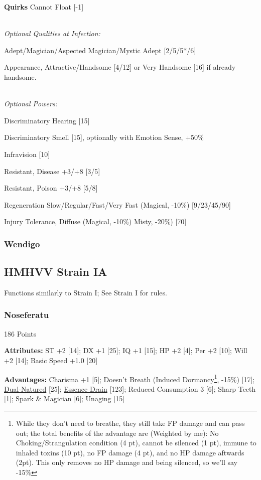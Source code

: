 \begin{multicols*}{3}
	\textbf{Quirks} 
	Cannot Float [-1]
	
	\textit{\\Optional Qualities at Infection:}
	
	Adept/Magician/Aspected Magician/Mystic Adept [2/5/5*/6]
	
	Appearance, Attractive/Handsome [4/12] or Very Handsome [16] if already handsome.	
	
	\textit{\\Optional Powers:}
		
	Discriminatory Hearing [15]
	
	Discriminatory Smell [15], optionally with Emotion Sense, +50\%
	
	Infravision [10]
	
	Resistant, Disease +3/+8 [3/5]
	
	Resistant, Poison +3/+8 [5/8]
	
	Regeneration Slow/Regular/Fast/Very Fast (Magical, -10\%) [9/23/45/90]
	
	Injury Tolerance, Diffuse (Magical, -10\%) Misty, -20\%) [70]
	
	\subsubsection{Wendigo}\label{wendigo}
	
	\subsection*{HMHVV Strain IA}
	
	Functions similarly to Strain I; See Strain I for rules.
	
	\subsubsection{Noseferatu}\label{nosferatu}
	\begin{flushright}
		186 Points
	\end{flushright}
	
	\textbf{Attributes:}
	ST +2 [14]; DX +1 [25]; IQ +1 [15]; HP +2 [4]; Per +2 [10]; Will +2 [14]; Basic Speed +1.0 [20]
	
	\textbf{Advantages:}
	Charisma +1 [5]; Doesn't Breath (Induced Dormancy\footnote{While they don't need to breathe, they still take FP damage and can pass out; the total benefits of the advantage are (Weighted by me): No Choking/Strangulation condition (4 pt), cannot be silenced (1 pt), immune to inhaled toxins (10 pt), no FP damage (4 pt), and no HP damage aftwards (2pt). This only removes no HP damage and being silenced, so we'll say -15\%}, -15\%) [17]; \hyperref[dual_natured]{Dual-Natured} [25];  \hyperref[essence_drain]{Essence Drain} [123]; Reduced Consumption 3 [6]; Sharp Teeth [1]; Spark \& Magician [6]; Unaging [15]
	

\end{multicols*}
